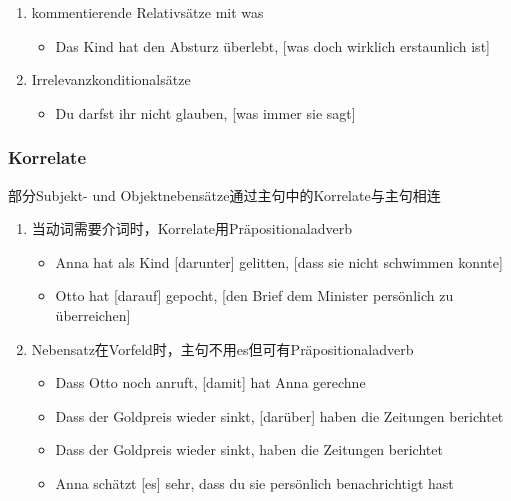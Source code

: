 \documentclass[UTF8]{report}
\begin{document}
\begin{enumerate}
\begin{enumerate}
\begin{itemize}
        \end{itemize}
        \item kommentierende Relativsätze mit was
        \begin{itemize}
            \item Das Kind hat den Absturz überlebt, [was doch wirklich erstaunlich ist]
        \end{itemize}
        \item Irrelevanzkonditionalsätze
        \begin{itemize}
            \item Du darfst ihr nicht glauben, [was immer sie sagt] 
        \end{itemize}
    \end{enumerate}
\end{enumerate}

\subsubsection{Korrelate}
部分Subjekt- und Objektnebensätze通过主句中的Korrelate与主句相连
\begin{enumerate}
    \item 当动词需要介词时，Korrelate用Präpositionaladverb
    \begin{itemize}
        \item Anna hat als Kind [darunter] gelitten, [dass sie nicht schwimmen konnte]
        \item Otto hat [darauf] gepocht, [den Brief dem Minister persönlich zu überreichen]
    \end{itemize}
    \item Nebensatz在Vorfeld时，主句不用es但可有Präpositionaladverb
    \begin{itemize}
        \item Dass Otto noch anruft, [damit] hat Anna gerechne
        \item Dass der Goldpreis wieder sinkt, [darüber] haben die Zeitungen berichtet
        \item Dass der Goldpreis wieder sinkt, haben die Zeitungen berichtet
        \item Anna schätzt [es] sehr, dass du sie persönlich benachrichtigt hast
    \end{itemize}
\end{enumerate}
\end{document}
